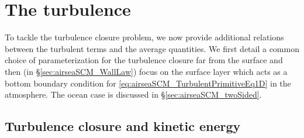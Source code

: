 \section{The turbulence}
\label{sec:airseaSCM_turbulence}
To tackle the turbulence closure problem,
we now provide additional relations between
the turbulent terms and the average quantities.
We first detail a common choice of parameterization
for the turbulence closure far from the surface and then
(in \S\ref{sec:airseaSCM_WallLaw}) focus on the surface layer
which acts as a bottom boundary condition for
\eqref{eq:airseaSCM_TurbulentPrimitiveEq1D} in the atmosphere.
The ocean case is discussed in \S\ref{sec:airseaSCM_twoSided}.
\subsection{Turbulence closure and kinetic energy}
\label{sec:airseaSCM_turbulentClosure}
